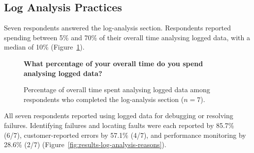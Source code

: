 \clearpage
\subsection{Log Analysis Practices}

Seven respondents answered the log-analysis section. Respondents reported
spending between 5\% and 70\% of their overall time analysing logged data, with a
median of 10\% (Figure~\ref{fig:results-log-analysis-time}).

\begin{figure}[H]
    \centering
    \begin{minipage}{0.92\textwidth}
        \centering
        \textbf{\small
        What percentage of your overall time do you spend analysing logged data?}
    \end{minipage}
    \vspace{0.7em}
    \caption{Percentage of overall time spent analysing logged data among
    respondents who completed the log-analysis section ($n=7$).}
    \label{fig:results-log-analysis-time}
\end{figure}

All seven respondents reported using logged data for debugging or resolving
failures. Identifying failures and locating faults were each reported by 85.7\%
(6/7), customer-reported errors by 57.1\% (4/7), and performance monitoring by
28.6\% (2/7) (Figure~\ref{fig:results-log-analysis-reasons}).


